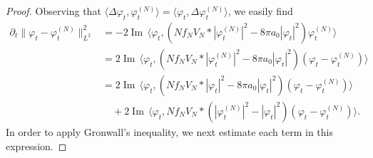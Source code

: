 \documentclass[11pt,a4paper]{scrartcl}
\renewcommand{\Im}{\operatorname{Im}\,} 	%
\begin{document}
\begin{proof}
  Observing that $\langle \Delta \varphi_t, \varphi_t^{(N)} \rangle = \langle
  \varphi_t, \Delta \varphi_t^{(N)} \rangle$, we easily find
  \begin{equation}\label{ddt}
    \begin{aligned}
      \partial_t \| \varphi_t - \varphi_t^{(N)} \|_{L^2}^2 & = -2 \Im \langle
      \varphi_t, (N f_N V_N * |\varphi_t^{(N)}|^2 - 8 \pi a_0 |\varphi_t|^2)
      \varphi_t^{(N)} \rangle \\
      & = 2 \Im \langle \varphi_t, (N f_N V_N * |\varphi_t^{(N)}|^2 - 8 \pi
      a_0 |\varphi_t|^2) (\varphi_t - \varphi_t^{(N)}) \rangle \\
      & = 2 \Im \langle \varphi_t, (N f_N V_N * |\varphi_t|^2 - 8 \pi a_0
      |\varphi_t|^2) (\varphi_t - \varphi_t^{(N)}) \rangle \\
      & \quad + 2 \Im \langle \varphi_t, N f_N V_N * (|\varphi_t^{(N)}|^2 -
      |\varphi_t|^2) (\varphi_t - \varphi_t^{(N)}) \rangle.
    \end{aligned}
  \end{equation}
  In order to apply Gronwall's inequality, we next estimate each term in this
  expression.



\end{proof}
\end{document}
